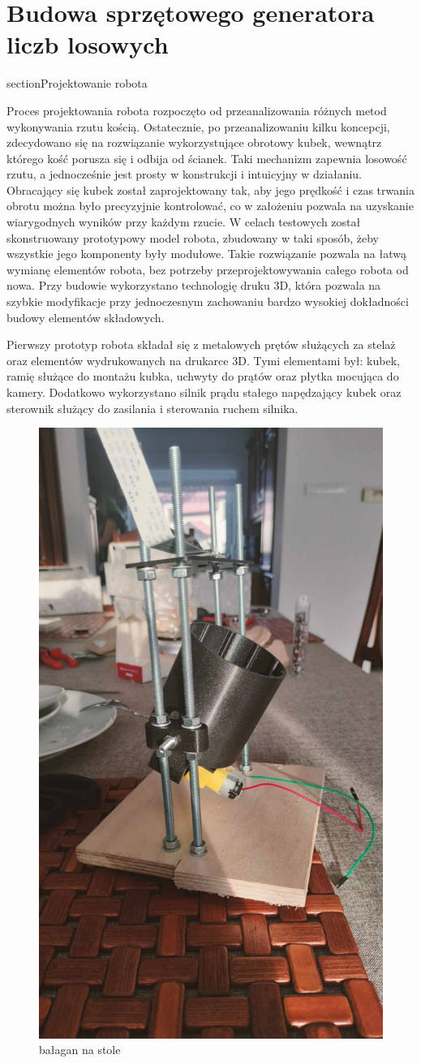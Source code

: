 
\chapter{Budowa sprzętowego generatora liczb losowych}
section{Projektowanie robota}

Proces projektowania robota rozpoczęto od przeanalizowania różnych metod wykonywania rzutu kością.
Ostatecznie, po przeanalizowaniu kilku koncepcji, zdecydowano się na rozwiązanie wykorzystujące obrotowy 
kubek, wewnątrz którego kość porusza się i odbija od ścianek. Taki mechanizm zapewnia losowość rzutu, a 
jednocześnie jest prosty w konstrukcji i intuicyjny w działaniu. Obracający się kubek został 
zaprojektowany tak, aby jego prędkość i czas trwania obrotu można było precyzyjnie kontrolować, co  w założeniu 
pozwala na uzyskanie wiarygodnych wyników przy każdym rzucie. W celach testowych został skonstruowany prototypowy
model robota, zbudowany w taki sposób, żeby wszystkie jego komponenty były modułowe. Takie rozwiązanie pozwala na 
łatwą wymianę elementów robota, bez potrzeby przeprojektowywania całego robota od nowa. Przy budowie wykorzystano 
technologię druku 3D, która pozwala na szybkie modyfikacje przy jednoczesnym zachowaniu bardzo wysokiej dokładności
budowy elementów składowych.

Pierwszy prototyp robota składał się z metalowych prętów służących za stelaż oraz elementów wydrukowanych na drukarce 3D.
Tymi elementami był: kubek, ramię służące do montażu kubka, uchwyty do prątów oraz płytka mocująca do kamery. Dodatkowo
wykorzystano silnik prądu stałego napędzający kubek oraz sterownik służący do zasilania i sterowania ruchem silnika.

\begin{figure}[H]
    \centering
    \includegraphics[width=0.25\linewidth]{chapters/03-praca-wlasna/figures/pierwszy}
    \caption{\label{fig:pierwszy}bałagan na stole}
\end{figure}
    

